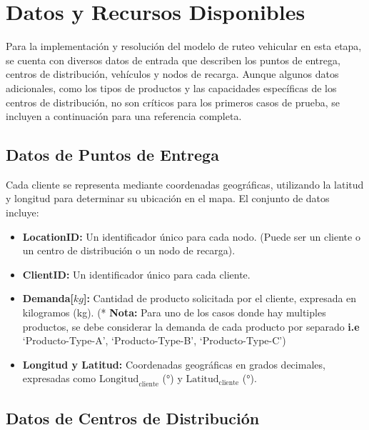 \documentclass[12pt]{article}
\begin{document}
\section{Datos y Recursos Disponibles}

Para la implementación y resolución del modelo de ruteo vehicular en esta etapa, se cuenta con diversos datos de entrada que describen los puntos de entrega, centros de distribución, vehículos y nodos de recarga. Aunque algunos datos adicionales, como los tipos de productos y las capacidades específicas de los centros de distribución, no son críticos para los primeros casos de prueba, se incluyen a continuación para una referencia completa.

\subsection{Datos de Puntos de Entrega}

Cada cliente se representa mediante coordenadas geográficas, utilizando la latitud y longitud para determinar su ubicación en el mapa. El conjunto de datos incluye:
\begin{itemize}
    \item \textbf{LocationID:} Un identificador único para cada nodo. (Puede ser un cliente o un centro de distribución o un nodo de recarga).
    \item \textbf{ClientID:} Un identificador único para cada cliente.
    \item \textbf{Demanda[$kg$]:} Cantidad de producto solicitada por el cliente, expresada en kilogramos (kg). (* \textbf{Nota:} Para uno de los casos donde hay multiples productos, se debe considerar la demanda de cada producto por separado \textbf{i.e} `Producto-Type-A', `Producto-Type-B', `Producto-Type-C')
    \item \textbf{Longitud y Latitud:} Coordenadas geográficas en grados decimales, expresadas como $\text{Longitud}_{\text{cliente}}$ (°) y $\text{Latitud}_{\text{cliente}}$ (°).
\end{itemize}

\subsection{Datos de Centros de Distribución}
\end{document}
